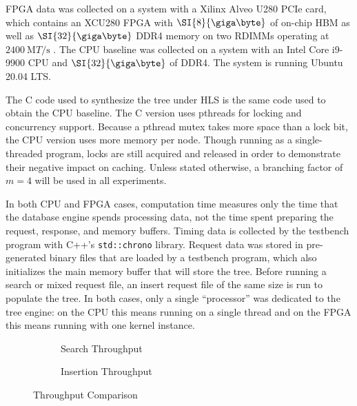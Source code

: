 

FPGA data was collected on a system with a Xilinx Alveo U280 PCIe card,
which contains an XCU280 FPGA with $\SI{8}{\giga\byte}$ of on-chip HBM as well
as $\SI{32}{\giga\byte}$ DDR4 memory on two RDIMMs operating at
$\SI{2400}{\mega{T}\per\second}$ \autocite{u280}. The CPU baseline was collected
on a system with an Intel Core i9-9900 CPU and $\SI{32}{\giga\byte}$ of DDR4.
The system is running Ubuntu 20.04 LTS.

The C code used to synthesize the tree under HLS is the same code used to obtain
the CPU baseline. The C version uses pthreads for locking and concurrency
support. Because a pthread mutex takes more space than a lock bit, the CPU
version uses more memory per node. Though running as a single-threaded program,
locks are still acquired and released in order to demonstrate their negative
impact on caching.
%
Unless stated otherwise, a branching factor of $m=4$ will be used in all
experiments.



In both CPU and FPGA cases, computation time measures only the time that the
database engine spends processing data, not the time spent preparing the
request, response, and memory buffers. Timing data is collected by the testbench
program with C++'s \texttt{std::chrono} library.
%
Request data was stored in pre-generated binary files that are loaded by a
testbench program, which also initializes the main memory buffer that will store
the tree.
% 
Before running a search or mixed request file, an insert request file of the
same size is run to populate the tree.
%
In both cases, only a single ``processor'' was dedicated to the tree engine: on
the CPU this means running on a single thread and on the FPGA this means running
with one kernel instance.



\begin{figure}[H]
	\centering
	\begin{subfigure}{7.5cm}
		\centering
		
		\caption{Search Throughput}
		\label{fig:search-throughput-comparison}
	\end{subfigure}
	\begin{subfigure}{7.5cm}
		\centering
		
		\caption{Insertion Throughput}
		\label{fig:insert-throughput-comparison}
	\end{subfigure}
	\caption{Throughput Comparison}
	\label{fig:throughput-comparison}
\end{figure}

